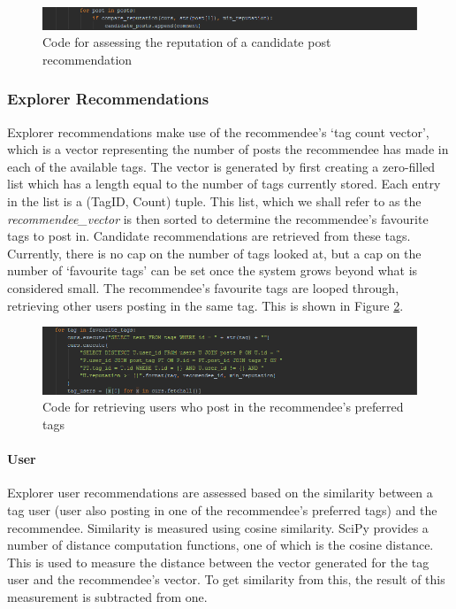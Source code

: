 \begin{figure}[H]
\centering
\includegraphics[width=\textwidth]{Images/Implementation/FOFPostReputation}
\caption{Code for assessing the reputation of a candidate post recommendation}
\label{fig:FOFPostReputation}
\end{figure} 

\subsubsection{Explorer Recommendations}
Explorer recommendations make use of the recommendee's `tag count vector', which is a vector representing the number of posts the recommendee has made in each of the available tags. The vector is generated by first creating a zero-filled list which has a length equal to the number of tags currently stored. Each entry in the list is a (TagID, Count) tuple. This list, which we shall refer to as the \emph{recommendee\_vector} is then sorted to determine the recommendee's favourite tags to post in. Candidate recommendations are retrieved from these tags. Currently, there is no cap on the number of tags looked at, but a cap on the number of `favourite tags' can be set once the system grows beyond what is considered small. The recommendee's favourite tags are looped through, retrieving other users posting in the same tag. This is shown in Figure \ref{fig:ExplorerFavouriteTags}.

\begin{figure}[H]
\centering
\includegraphics[width=\textwidth]{Images/Implementation/ExplorerFavouriteTags}
\caption{Code for retrieving users who post in the recommendee's preferred tags}
\label{fig:ExplorerFavouriteTags}
\end{figure}

\paragraph{User} Explorer user recommendations are assessed based on the similarity between a tag user (user also posting in one of the recommendee's preferred tags) and the recommendee. Similarity is measured using cosine similarity. SciPy provides a number of distance computation functions, one of which is the cosine distance. This is used to measure the distance between the vector generated for the tag user and the recommendee's vector. To get similarity from this, the result of this measurement is subtracted from one.

